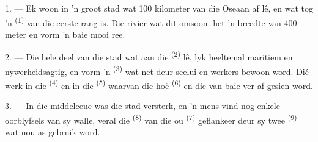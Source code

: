 %
%
%
%

\VUsaut{2.0mm}
\VUsaut{3.0mm}
\VUfilet{16mm}
\VUsaut{5.6mm}
\VUsaut{1.4mm}
\VUsaut{2.2mm}

\VUsaut{3.0mm}

1. --- Ek woon in 'n groot stad wat 100 kilometer van die Oseaan af lê, en wat tog 'n
 \textsuperscript{(1)} van die eerste rang is. Die rivier wat dit omsoom het
'n breedte van 400 meter en vorm 'n baie mooi ree.

2. --- Die hele deel van die stad wat aan die  \textsuperscript{(2)} lê,
lyk heeltemal maritiem en nywerheidsagtig, en vorm 'n 
\textsuperscript{(3)} wat net deur seelui en werkers bewoon word. Dié werk in die
 \textsuperscript{(4)} en in die 
\textsuperscript{(5)} waarvan die hoë  \textsuperscript{(6)} en die
 van baie ver af gesien word.

3. --- In die middeleeue was die stad versterk, en 'n mens vind nog enkele oorblyfsels
van sy walle, veral die  \textsuperscript{(8)} van die ou  \textsuperscript{(7)} geflankeer deur sy twee 
\textsuperscript{(9)} wat nou as  gebruik word.

